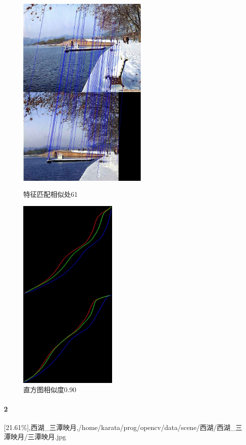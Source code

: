 \begin{figure}[htb]
\begin{minipage}[t]{0.5\linewidth}
\centering
\includegraphics[height=3.8in]{断桥.jpg.d/im1sift.jpg}
\caption{特征匹配相似处61}
\label{fig:side:a}
\end{minipage}%
\begin{minipage}[t]{0.5\linewidth}
\centering
\includegraphics[height=3.8in]{断桥.jpg.d/im1hist2.jpg}
\caption{直方图相似度0.90}
\label{fig:side:a}
\end{minipage}%
\end{figure}

\clearpage
\paragraph{2}
[21.61\%],西湖\_三潭映月,/home/karata/prog/opencv/data/scene/西湖/西湖\_三潭映月/三潭映月.jpg

